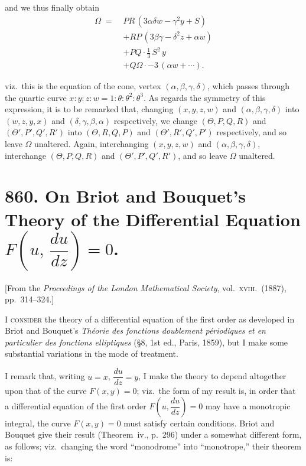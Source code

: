 \documentclass[11pt]{article}
\begin{document}
\medskip

\noindent and we thus finally obtain
\begin{align*}
\Omega \;=\; & PR\,(3\alpha\delta w - \gamma^2 y + S) \\
 & + RP\,(3\beta\gamma - \delta^2 z + \alpha w) \\
 & + PQ \cdot \tfrac{1}{3}\,S^2\, y \\
 & + Q\Omega \cdot - 3\,(\alpha w + \cdots).
\end{align*}

\medskip

\noindent viz.\ this is the equation of the cone, vertex $(\alpha,\beta,\gamma,\delta)$, which passes through the quartic curve $x:y:z:w = 1:\theta:\theta^2:\theta^3$. As regards the symmetry of this expression, it is to be remarked that, changing $(x,y,z,w)$ and $(\alpha,\beta,\gamma,\delta)$ into $(w,z,y,x)$ and $(\delta,\gamma,\beta,\alpha)$ respectively, we change $(\Theta,P,Q,R)$ and $(\Theta',P',Q',R')$ into $(\Theta,R,Q,P)$ and $(\Theta',R',Q',P')$ respectively, and so leave $\Omega$ unaltered. Again, interchanging $(x,y,z,w)$ and $(\alpha,\beta,\gamma,\delta)$, interchange $(\Theta,P,Q,R)$ and $(\Theta',P',Q',R')$, and so leave $\Omega$ unaltered.

\vfill
\newpage

\section*{860. On Briot and Bouquet's Theory of the Differential Equation $F\!\left(u,\,\dfrac{du}{dz}\right)=0$.}

\begin{flushright}\small
[From the \textit{Proceedings of the London Mathematical Society}, vol.~\textsc{xviii}.\ (1887), pp.~314--324.]
\end{flushright}

\medskip

\noindent\textsc{I consider} the theory of a differential equation of the first order as developed in Briot and Bouquet's \textit{Th\'eorie des fonctions doublement p\'eriodiques et en particulier des fonctions elliptiques} (\S 8, 1st ed., Paris, 1859), but I make some substantial variations in the mode of treatment.

I remark that, writing $u=x$, $\dfrac{du}{dz}=y$, I make the theory to depend altogether upon that of the curve $F(x,y)=0$; viz.\ the form of my result is, in order that a differential equation of the first order $F\!\left(u,\dfrac{du}{dz}\right)=0$ may have a monotropic integral, the curve $F(x,y)=0$ must satisfy certain conditions. Briot and Bouquet give their result (Theorem~iv., p.~296) under a somewhat different form, as follows; viz.\ changing the word ``monodrome'' into ``monotrope,'' their theorem is:
\end{document}
